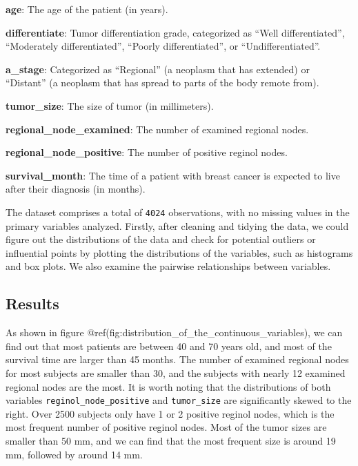 \documentclass[
]{article}
\begin{document}
\textbf{age}: The age of the patient (in years).

\textbf{differentiate}: Tumor differentiation grade, categorized as ``Well differentiated'', ``Moderately differentiated'', ``Poorly differentiated'', or ``Undifferentiated''.

\textbf{a\_stage}: Categorized as ``Regional'' (a neoplasm that has extended) or ``Distant'' (a neoplasm that has spread to
parts of the body remote from).

\textbf{tumor\_size}: The size of tumor (in millimeters).

\textbf{regional\_node\_examined}: The number of examined regional nodes.

\textbf{regional\_node\_positive}: The number of positive reginol nodes.

\textbf{survival\_month}: The time of a patient with breast cancer is expected to live after their diagnosis (in months).

The dataset comprises a total of \texttt{4024} observations, with no missing values in the primary variables analyzed. Firstly, after cleaning and tidying the data, we could figure out the distributions of the data and check for potential outliers or influential points by plotting the distributions of the variables, such as histograms and box plots. We also examine the pairwise relationships between variables.

\subsection{Results}\label{results}

As shown in figure @ref(fig:distribution\_of\_the\_continuous\_variables), we can find out that most patients are between 40 and 70 years old, and most of the survival time are larger than 45 months. The number of examined regional nodes for most subjects are smaller than 30, and the subjects with nearly 12 examined regional nodes are the most. It is worth noting that the distributions of both variables \texttt{reginol\_node\_positive} and \texttt{tumor\_size} are significantly skewed to the right. Over 2500 subjects only have 1 or 2 positive reginol nodes, which is the most frequent number of positive reginol nodes. Most of the tumor sizes are smaller than 50 mm, and we can find that the most frequent size is around 19 mm, followed by around 14 mm.
\end{document}
